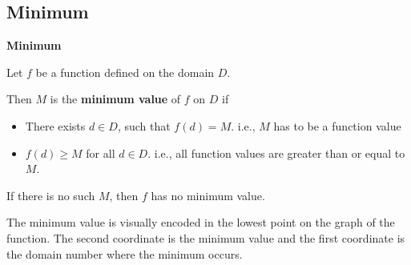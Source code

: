 \documentclass{ximera}
\begin{document}
\subsection*{Minimum}



\begin{definition} \textbf{\textcolor{green!50!black}{Minimum}} 


Let $f$ be a function defined on the domain $D$.

Then $M$ is the \textbf{minimum value} of $f$ on $D$ if    


\begin{itemize}
\item There exists $d \in D$, such that $f(d) = M$.   i.e., $M$ has to be a function value \\

\item $f(d) \geq M$ for all $d \in D$. i.e., all function values are greater than or equal to $M$. 

\end{itemize}


If there is no such $M$, then $f$ has no minimum value.

\end{definition}



\begin{observation}
The minimum value is visually encoded in the lowest point on the graph of the function.  The second coordinate is the minimum value and the first coordinate is the domain number where the minimum occurs.
\end{observation}
\end{document}
